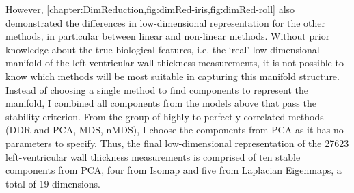 %
However, \cref{chapter:DimReduction,fig:dimRed-iris,fig:dimRed-roll} also demonstrated the differences in low-dimensional representation for the other methods, in particular between linear and non-linear methods. Without prior knowledge about the true biological features, i.e. the `real' low-dimensional manifold of the left ventricular wall thickness measurements, it is not possible to know which methods will be most suitable in capturing this manifold structure. 
Instead of choosing a single method to find components to represent the manifold, I combined all components from the models above that pass the stability criterion. From the group of highly to perfectly correlated methods (DDR and PCA, MDS, nMDS), I choose the components from PCA as it has no parameters to specify. Thus, the final low-dimensional representation of the \num{27623} left-ventricular wall thickness measurements is comprised of ten stable components from PCA, four from Isomap and five from Laplacian Eigenmaps, a total of \num{19} dimensions.



 


